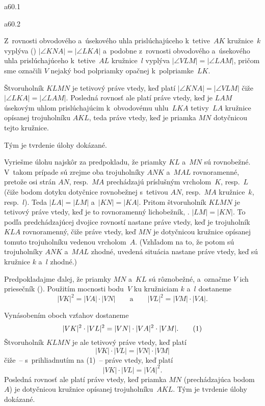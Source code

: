 {%
\epsplace a60.1 \hfil\Obr\par
\epsplace a60.2 \hfil\Obr\par
Z~rovnosti obvodového a~úsekového uhla prislúchajúceho k~tetive~$AK$ kružnice~$k$ vyplýva (\obr)
\hbox {$|\angle KNA|=|\angle LKA|$} a~podobne z~rovnosti obvodového a~úsekového uhla prislúchajúceho
k~tetive~$AL$ kružnice~$l$ vyplýva $|\angle VLM|=|\angle LAM|$, pričom sme označili $V$
nejaký bod polpriamky opačnej k~polpriamke~$LK$.

\inspicture

Štvoruholník $KLMN$ je tetivový práve vtedy, keď platí $|\angle KNA|=|\angle VLM|$ čiže
$|\angle LKA|=|\angle LAM|$. Posledná rovnosť ale platí
práve vtedy, keď je $LAM$ úsekovým uhlom prislúchajúcim k~obvodovému uhlu~$LKA$ tetivy~$LA$
kružnice opísanej trojuholníku $AKL$, teda práve vtedy, keď je priamka $MN$ dotyčnicou tejto kružnice.

Tým je tvrdenie úlohy dokázané.

\ineriesenie
Vyriešme úlohu najskôr za predpokladu, že priamky $KL$ a~$MN$ sú rovnobežné.
V~takom prípade sú zrejme oba trojuholníky $ANK$ a~$MAL$ rovnoramenné, pretože osi strán
$AN$, resp.~$MA$ prechádzajú príslušným vrcholom~$K$, resp.~$L$ (čiže bodom dotyku
dotyčnice rovnobežnej s~tetivou $AN$, resp.~$MA$ kružnice~$k$, resp.~$l$).
Teda $|LA|=|LM|$ a~$|KN|=|KA|$.
Pritom štvoruholník $KLMN$ je tetivový práve vtedy, keď je to rovnoramenný
lichobežník, \tj. $|LM|=|KN|$.
To podľa predchádzajúcej dvojice rovností nastane práve vtedy, keď je trojuholník $KLA$
rovnoramenný, čiže
práve vtedy, keď $MN$ je dotyčnicou
kružnice opísanej tomuto trojuholníku vedenou vrcholom~$A$.
(Vzhľadom na to, že potom sú trojuholníky $ANK$ a~$MAL$ zhodné, uvedená situácia nastane
práve vtedy, keď sú kružnice $k$ a~$l$ zhodné.)

Predpokladajme ďalej, že
priamky $MN$ a~$KL$ sú rôznobežné, a~označme $V$ ich priesečník (\obr).
Použitím mocnosti bodu~$V$ ku kružniciam $k$ a~$l$ dostaneme
$$
|VK|^2=|VA|\cdot |VN| \qquad \text{a} \qquad  |VL|^2=|VM|\cdot |VA|.
$$

\inspicture

Vynásobením oboch vzťahov dostaneme
$$
|VK|^2\cdot |VL|^2=|VN|\cdot |VA|^2 \cdot |VM|. \tag1
$$
Štvoruholník $KLMN$ je ale tetivový práve vtedy, keď platí
$$
|VK|\cdot |VL|=|VN|\cdot |VM|
$$
čiže~-- s~prihliadnutím na (1)~-- práve vtedy, keď platí
$$
|VK|\cdot |VL|=|VA|^2.
$$
Posledná rovnosť ale platí práve vtedy, keď priamka $MN$ (prechádzajúca bodom~$A$)
je dotyčnicou kružnice opísanej trojuholníku~$AKL$.
Tým je tvrdenie úlohy dokázané.

}
